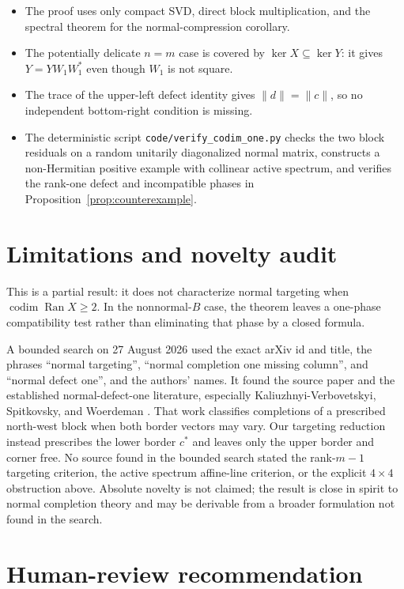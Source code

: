 \documentclass[11pt]{article}
\newcommand{\Ran}{\operatorname{Ran}}
\begin{document}
\begin{itemize}[leftmargin=*]
\item The proof uses only compact SVD, direct block multiplication, and the
spectral theorem for the normal-compression corollary.
\item The potentially delicate $n=m$ case is covered by
$\ker X\subseteq\ker Y$: it gives $Y=YW_1W_1^*$ even though $W_1$ is not
square.
\item The trace of the upper-left defect identity gives
$\|d\|=\|c\|$, so no independent bottom-right condition is missing.
\item The deterministic script \texttt{code/verify\_codim\_one.py} checks
the two block residuals on a random unitarily diagonalized normal matrix,
constructs a non-Hermitian positive example with collinear active spectrum,
and verifies the rank-one defect and incompatible phases in
Proposition~\ref{prop:counterexample}.
\end{itemize}

\section{Limitations and novelty audit}

This is a partial result: it does not characterize normal targeting when
$\operatorname{codim}\Ran X\ge2$.  In the nonnormal-$B$ case, the theorem
leaves a one-phase compatibility test rather than eliminating that phase by a
closed formula.

A bounded search on 27 August 2026 used the exact arXiv id and title, the
phrases ``normal targeting'', ``normal completion one missing column'', and
``normal defect one'', and the authors' names.  It found the source paper and
the established normal-defect-one literature, especially
Kaliuzhnyi-Verbovetskyi, Spitkovsky, and Woerdeman \cite{KSW}.  That work
classifies completions of a prescribed north-west block when both border
vectors may vary.  Our targeting reduction instead prescribes the lower
border $c^*$ and leaves only the upper border and corner free.  No source found
in the bounded search stated the rank-$m-1$ targeting criterion, the active
spectrum affine-line criterion, or the explicit $4\times4$ obstruction above.
Absolute novelty is not claimed; the result is close in spirit to normal
completion theory and may be derivable from a broader formulation not found
in the search.

\section{Human-review recommendation}
\end{document}
